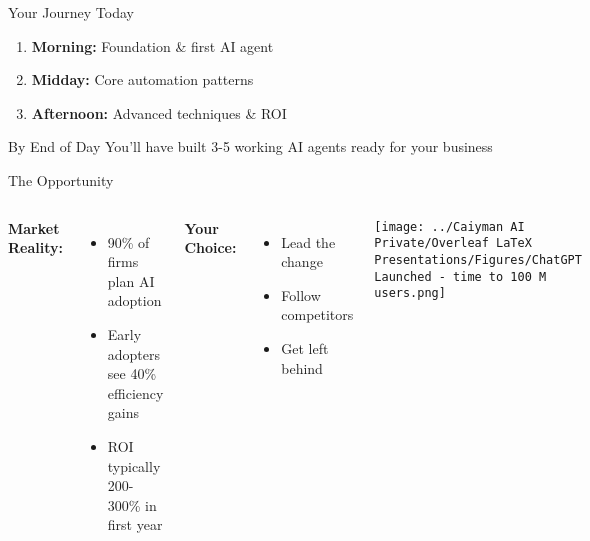 \documentclass{beamer}
\begin{document}
\begin{frame}{Your Journey Today}
  \large
  \begin{enumerate}
    \item \textbf{Morning:} Foundation \& first AI agent
    \item \textbf{Midday:} Core automation patterns
    \item \textbf{Afternoon:} Advanced techniques \& ROI
  \end{enumerate}
  
  \vspace{0.5cm}
  
  \begin{block}{By End of Day}
    You'll have built 3-5 working AI agents ready for your business
  \end{block}
\end{frame}

\begin{frame}{The Opportunity}
  \begin{columns}[onlytextwidth]
      \textbf{Market Reality:}
      \begin{itemize}
        \item 90\% of firms plan AI adoption
        \item Early adopters see 40\% efficiency gains
        \item ROI typically 200-300\% in first year
      \end{itemize}
      
      \vspace{0.3cm}
      \textbf{Your Choice:}
      \begin{itemize}
        \item Lead the change
        \item Follow competitors
        \item Get left behind
      \end{itemize}
    
      \centering
      \texttt{[image: ../Caiyman AI Private/Overleaf LaTeX Presentations/Figures/ChatGPT Launched - time to 100 M users.png]}
  \end{columns}
\end{frame}
\end{document}
